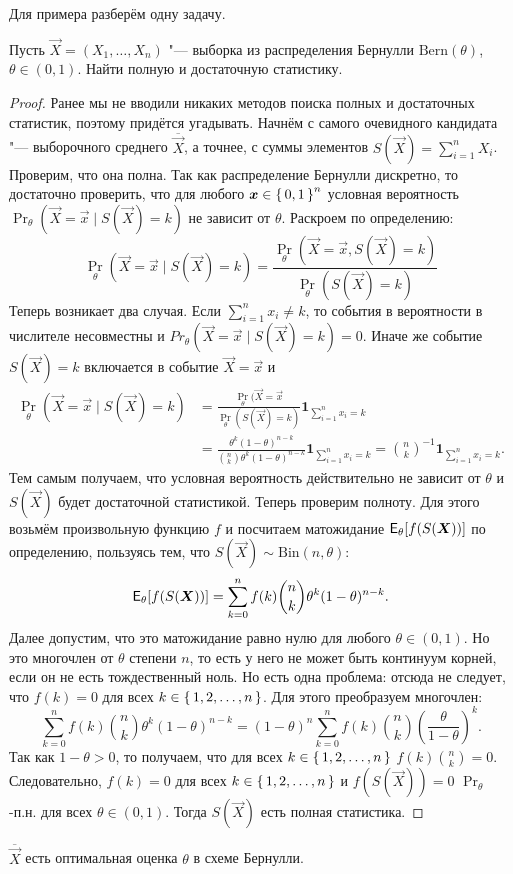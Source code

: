 Для примера разберём одну задачу.
\begin{problem}
	Пусть $\vec{X} = (X_{1}, \ldots, X_{n})$ "--- выборка из распределения Бернулли $\mathrm{Bern}(\theta)$, $\theta \in (0, 1)$. Найти полную и достаточную статистику.
\end{problem}
\begin{proof}
	Ранее мы не вводили никаких методов поиска полных и достаточных статистик, поэтому придётся угадывать. Начнём с самого очевидного кандидата "--- выборочного среднего $\overline{\vec{X}}$, а точнее, с суммы элементов $S(\vec{X}) = \sum_{i = 1}^{n} X_{i}$. Проверим, что она полна. Так как распределение Бернулли дискретно, то достаточно проверить, что для любого $\bm{x} \in \set{0, 1}^{n}$ условная вероятность $\Pr_{\theta}(\vec{X} = \vec{x} \mid S(\vec{X}) = k)$ не зависит от $\theta$. Раскроем по определению:
	\[
		\Pr_{\theta}(\vec{X} = \vec{x} \mid S(\vec{X}) = k)
		= \frac{\Pr_{\theta}(\vec{X} = \vec{x}, S(\vec{X}) = k)}{\Pr_{\theta}(S(\vec{X}) = k)}
	\]
	Теперь возникает два случая. Если $\sum_{i = 1}^{n} x_{i} \neq k$, то события в вероятности в числителе несовместны и $Pr_{\theta}(\vec{X} = \vec{x} \mid S(\vec{X}) = k) = 0$. Иначе же событие $S(\vec{X}) = k$ включается в событие $\vec{X} = \vec{x}$ и
	\begin{align*}
		\Pr_{\theta}(\vec{X} = \vec{x} \mid S(\vec{X}) = k)
		&= \frac{\Pr_{\theta}(\vec{X} = \vec{x}}{\Pr_{\theta}(S(\vec{X}) = k)}\mathbf{1}_{\sum_{i = 1}^{n} x_{i} = k} \\
		&= \frac{\theta^{k}(1 - \theta)^{n - k}}{\binom{n}{k}\theta^{k}(1 - \theta)^{n - k}}\mathbf{1}_{\sum_{i = 1}^{n} x_{i} = k}
		= \binom{n}{k}^{-1}\mathbf{1}_{\sum_{i = 1}^{n} x_{i} = k}.
	\end{align*} 
	Тем самым получаем, что условная вероятность действительно не зависит от $\theta$ и $S(\vec{X})$ будет достаточной статистикой. Теперь проверим полноту. Для этого возьмём произвольную функцию $f$ и посчитаем матожидание $\operatorname{\mathsf{E}}_{\theta}[f(S(\bm{X}))]$ по определению, пользуясь тем, что $S(\vec{X}) \sim \mathrm{Bin}(n, \theta)$:
	\[
		\operatorname{\mathsf{E}}_{\theta}[f(S(\bm{X}))]
		= \sum_{k = 0}^{n} f(k)\binom{n}{k}\theta^{k}(1 - \theta)^{n - k}.
	\]
	Далее допустим, что это матожидание равно нулю для любого $\theta \in (0, 1)$. Но это многочлен от $\theta$ степени $n$, то есть у него не может быть континуум корней, если он не есть тождественный ноль. Но есть одна проблема: отсюда не следует, что $f(k) = 0$ для всех $k \in \set{1, 2, \ldots, n}$. Для этого преобразуем многочлен:
	\[
		\sum_{k = 0}^{n} f(k)\binom{n}{k}\theta^{k}(1 - \theta)^{n - k}
		= (1 - \theta)^{n}\sum_{k = 0}^{n} f(k)\binom{n}{k}\left(\frac{\theta}{1 - \theta}\right)^{k}.
	\] 
	Так как $1 - \theta > 0$, то получаем, что для всех $k \in \set{1, 2, \ldots, n}$ $f(k)\binom{n}{k} = 0$. Следовательно, $f(k) = 0$ для всех $k \in \set{1, 2, \ldots, n}$ и $f(S(\vec{X})) = 0$ $\Pr_{\theta}$-п.н. для всех $\theta \in (0, 1)$. Тогда $S(\vec{X})$ есть полная статистика.
\end{proof}
\begin{consequence}
	$\overline{\vec{X}}$ есть оптимальная оценка $\theta$ в схеме Бернулли.
\end{consequence}

